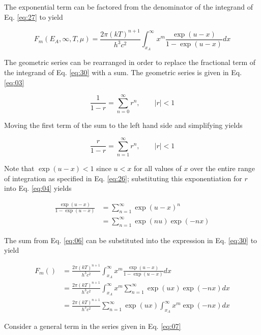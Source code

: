 \documentclass[letterpaper,12pt]{article}
\begin{document}
The exponential term can be factored from the denominator of the integrand of Eq. \ref{eq:27} to yield

\begin{equation} \label{eq:30}
F_{m}(E_{A},\infty,T,\mu) = \frac{2 \pi (kT)^{n+1}}{h^{3}c^{2}} \int_{x_{A}}^{\infty} x^{m} \frac{\exp(u-x)}{1 - \exp(u-x)} dx
\end{equation}


The geometric series can be rearranged in order to replace the fractional term of the integrand of Eq. \ref{eq:30} with a sum. The geometric series is given in Eq. \ref{eq:03}

\begin{equation} \label{eq:03}
\frac{1}{1-r} = \sum_{n = 0}^{\infty} r^{n}, \qquad |r| < 1
\end{equation}

\noindent Moving the first term of the sum to the left hand side and simplifying yields

\begin{equation} \label{eq:04}
\frac{r}{1-r} = \sum_{n = 1}^{\infty} r^{n}, \qquad |r| < 1
\end{equation}


Note that $\exp(u-x) < 1$ since $u < x$ for all values of $x$ over the entire range of integration as specified in Eq. \ref{eq:26}; substituting this exponentiation for $r$ into Eq. \ref{eq:04} yields

\begin{align} \label{eq:06}
\frac{\exp(u-x)}{1 - \exp(u-x)} &= \sum_{n = 1}^{\infty} \exp(u-x)^{n} \nonumber \\
 &= \sum_{n = 1}^{\infty} \exp(nu) \exp(-nx)
\end{align}


The sum from Eq. \ref{eq:06} can be substituted into the expression in Eq. \ref{eq:30} to yield

\begin{align} \label{eq:07}
F_{m}() &= \frac{2\pi (kT)^{n+1}}{h^{3} c^{2}} \int_{x_{A}}^{\infty} x^{m} \frac{\exp(u-x)}{1 - \exp(u-x)} dx \nonumber \\
 &= \frac{2\pi (kT)^{n+1}}{h^{3} c^{2}} \int_{x_{A}}^{\infty} x^{m} \sum_{n = 1}^{\infty} \exp(ux) \exp(-nx) dx \nonumber \\
 &= \frac{2\pi (kT)^{n+1}}{h^{3} c^{2}} \sum_{n = 1}^{\infty} \exp(ux) \int_{x_{A}}^{\infty} x^{m} \exp(-nx) dx
\end{align}

Consider a general term in the series given in Eq. \ref{eq:07}
\end{document}

